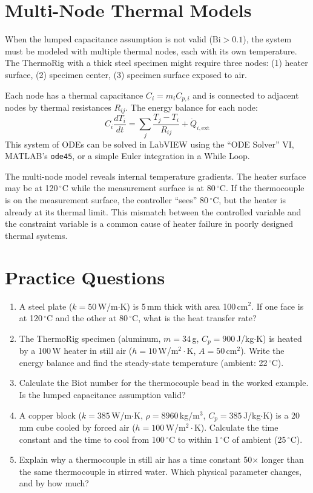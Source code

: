 \documentclass[11pt,letterpaper,twoside,openany]{book}
\newcommand{\degC}{\ensuremath{{}^{\circ}\text{C}}}
\begin{document}
\section{Multi-Node Thermal Models}
When the lumped capacitance assumption is not valid ($\text{Bi} > 0.1$), the system must be modeled with multiple thermal nodes, each with its own temperature. The ThermoRig with a thick steel specimen might require three nodes: (1) heater surface, (2) specimen center, (3) specimen surface exposed to air.

Each node has a thermal capacitance $C_i = m_i C_{p,i}$ and is connected to adjacent nodes by thermal resistances $R_{ij}$. The energy balance for each node:
\begin{equation}
C_i \frac{dT_i}{dt} = \sum_j \frac{T_j - T_i}{R_{ij}} + \dot{Q}_{i,\text{ext}}
\end{equation}
This system of ODEs can be solved in LabVIEW using the ``ODE Solver'' VI, MATLAB's \texttt{ode45}, or a simple Euler integration in a While Loop.

The multi-node model reveals internal temperature gradients. The heater surface may be at 120\,\degC{} while the measurement surface is at 80\,\degC{}. If the thermocouple is on the measurement surface, the controller ``sees'' 80\,\degC{}, but the heater is already at its thermal limit. This mismatch between the controlled variable and the constraint variable is a common cause of heater failure in poorly designed thermal systems.
\section{Practice Questions}
\begin{enumerate}[leftmargin=1.5em]
\item A steel plate ($k = 50$\,W/m$\cdot$K) is 5\,mm thick with area 100\,cm$^2$. If one face is at 120\,\degC{} and the other at 80\,\degC{}, what is the heat transfer rate?
\item The ThermoRig specimen (aluminum, $m = 34$\,g, $C_p = 900$\,J/kg$\cdot$K) is heated by a 100\,W heater in still air ($h = 10$\,W/m$^2\cdot$K, $A = 50$\,cm$^2$). Write the energy balance and find the steady-state temperature (ambient: 22\,\degC{}).
\item Calculate the Biot number for the thermocouple bead in the worked example. Is the lumped capacitance assumption valid?
\item A copper block ($k = 385$\,W/m$\cdot$K, $\rho = 8960$\,kg/m$^3$, $C_p = 385$\,J/kg$\cdot$K) is a 20\,mm cube cooled by forced air ($h = 100$\,W/m$^2\cdot$K). Calculate the time constant and the time to cool from 100\,\degC{} to within 1\,\degC{} of ambient (25\,\degC{}).
\item Explain why a thermocouple in still air has a time constant 50$\times$ longer than the same thermocouple in stirred water. Which physical parameter changes, and by how much?
\end{enumerate}
\end{document}
